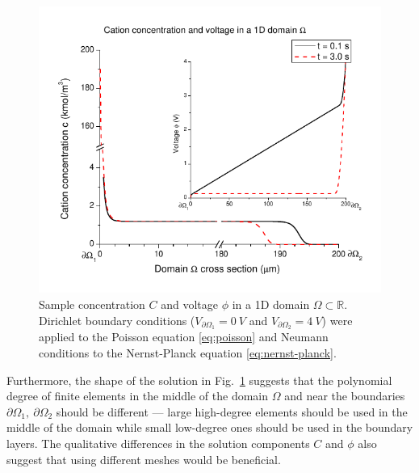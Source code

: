 \begin{figure}[!ht]
  \begin{centering}
      \includegraphics{comsol_conc_volt}
  \caption{Sample concentration $C$ and voltage $\phi$
           in a 1D domain $\Omega\subset\mathbb{R}$.
           Dirichlet boundary conditions ($V_{\partial \Omega_1}=0\ V$
           and $V_{\partial \Omega_2}=4\ V$) were
	   applied to the Poisson equation \eqref{eq:poisson} and Neumann conditions
	   to the Nernst-Planck equation \eqref{eq:nernst-planck}.}
\label{fig:comsol-conc-volt}
  \end{centering}
\end{figure}



Furthermore, the shape of the solution in Fig.~\ref{fig:comsol-conc-volt}
suggests that the polynomial degree of finite elements in the middle
of the domain $\Omega$ and near the boundaries $\partial \Omega_1,\ \partial \Omega_2$
should be different --- large high-degree elements should be used in the middle of the 
domain while small low-degree ones should be used in the boundary layers.  
The qualitative differences in the solution components $C$ and $\phi$ 
also suggest that using different meshes would be beneficial. 




